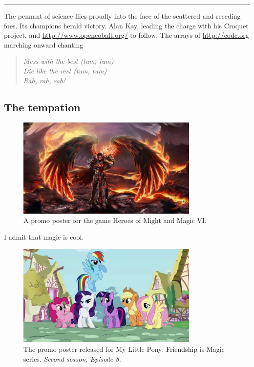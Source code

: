 \documentclass[11pt]{article}
\begin{document}
\noindent\rule{\textwidth}{0.5pt}

The pennant of science flies proudly into the face of the scattered and
receding foes.  Its champions herald victory.  Alan Kay, leading the charge
with his Croquet project, and \url{http://www.opencobalt.org/} to follow.  The
arrays of \url{http://code.org} marching onward chanting

\begin{verse}
  \itshape
  Mess with the best (tum, tum) \\
  Die like the rest (tum, tum) \\
  Rah, rah, rah!
\end{verse}
\subsection{The tempation}
\label{sec-1-2}

\begin{figure}[h!]
  \centering
  \includegraphics[width=0.8\textwidth]{./Might-and-Magic-Heroes-VI-Angel.jpg}
  \caption[HOMM VI promo poster]{
    \ssmall A promo poster for the game Heroes of Might and Magic VI.}
\end{figure}

I admit that magic is cool.

\begin{figure}[h!]
  \centering
  \includegraphics[width=0.8\textwidth]{./mlp.jpg}
  \caption[MLP season 2 episode 8]{
    \ssmall The promo poster released for My Little Pony: 
    Friendship is Magic series.
    \textit{Second season, Episode 8.}}
\end{figure}
\end{document}
